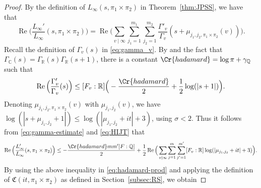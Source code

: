 \documentclass[12pt,reqno]{amsart}
\theoremstyle{remark}
\DeclareMathOperator{\Real}{Re}
\DeclareMathOperator{\Imag}{Im}
\renewcommand{\Re}{\mathrm{Re}}
\newcommand{\R}{\mathbb{R}}
\numberwithin{equation}{section}
\begin{document}
\begin{proof}
        By the definition of $L_{\infty}(s, \pi_1 \times \pi_2)$ in Theorem~\ref{thm:JPSS}, we have that 
        \begin{equation}\label{eq:gamma-estimate}
        \Real\Big(\frac{L_{\infty}'}{L_{\infty}}(s, \pi_1 \times \pi_2) \Big)  = \Real\Big(\sum_{v\mid\infty}\sum_{j_1=1}^{m_1} \sum_{j_2=1}^{m_2}\frac{\Gamma'_v}{\Gamma_v}(s+\mu_{j_1,j_2,\pi_1\times\pi_2}(v))\Big).
        \end{equation} 
       Recall the definition of $\Gamma_v(s)$ in \eqref{eq:gamma_v}. By  \cite[Lemma 4.1]{HIJT} and the fact that $\Gamma_{\mathbb{C}}(s) = \Gamma_{\R}(s)\Gamma_{\R}(s+1)$, there is a constant $\Cr{hadamard} = \log{\pi}+ \gamma_{\mathbb{Q}}$ such that 
        \begin{equation}\label{eq:HIJT} \Real\Big(\frac{\Gamma_v'}{\Gamma_v}(s)\Big) \le [F_v:\mathbb{R}]\Big(-\frac{\Cr{hadamard}}{2} +\frac{1}{2}\log(|s+1|)\Big). %
        \end{equation}
    Denoting $\mu_{j_1, j_2, \pi_1 \times \pi_2}(v)$ with $\mu_{j_1,j_2}(v)$, we have $\log(|s+\mu_{j_1,j_2}+1|) \le  \log(|\mu_{j_1,j_2}+it|+3)$, using $\sigma <2$. Thus it follows from \eqref{eq:gamma-estimate} and \eqref{eq:HIJT} that
    \begin{equation*}
    \begin{aligned}
    \Real\Big(\frac{L_{\infty}'}{L_{\infty}}(s, \pi_1 \times \pi_2) \Big)%
         \le -\frac{\Cr{hadamard}mm'[F:\mathbb{Q}]}{2}+ \frac{1}{2}\Real\Big(\sum_{v\mid\infty}\sum_{j=1}^m \sum_{j'=1}^{m'}[F_v:\mathbb{R}]\log(|\mu_{j_1,j_2}+it|+3)\Big).
    \end{aligned}
    \end{equation*}
  By using the above inequality in \eqref{eq:hadamard-prod} and applying the definition of $\mathfrak{C}(it, \pi_1 \times \pi_2)$ as defined in Section~\ref{subsec:RS}, we obtain

\end{proof}
\end{document}
